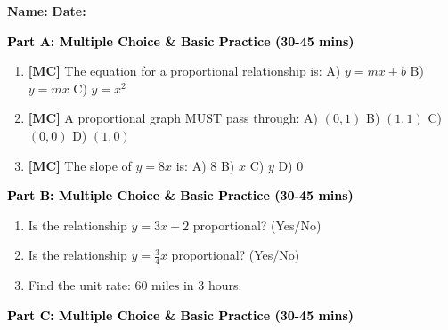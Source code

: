 \documentclass[12pt, letterpaper, fleqn]{article}
\newcommand{\blank}{\underline{\hspace{2.2cm}}}
\begin{document}
\textbf{Name:} \underline{\hspace{5cm}}
\hfill
\textbf{Date:} \underline{\hspace{3cm}}\\


\begin{tcolorbox}[colback=customteal!20]
\large\textcolor{black}{\textbf{Part A: Multiple Choice \& Basic Practice (30-45 mins)}}
\end{tcolorbox}

\vspace{3mm}

\begin{enumerate}[itemsep=2.5cm, leftmargin=0.6cm]
\item \textbf{[MC]} The equation for a proportional relationship is:
A) $y = mx + b$ \quad B) $y = mx$ \quad C) $y = x^2$
\item \textbf{[MC]} A proportional graph MUST pass through:
A) $(0, 1)$ \quad B) $(1, 1)$ \quad C) $(0, 0)$ \quad D) $(1, 0)$
\item \textbf{[MC]} The slope of $y = 8x$ is:
A) 8 \quad B) $x$ \quad C) $y$ \quad D) 0
\end{enumerate}

\newpage

\begin{tcolorbox}[colback=customteal!20]
\large\textcolor{black}{\textbf{Part B: Multiple Choice \& Basic Practice (30-45 mins)}}
\end{tcolorbox}

\vspace{3mm}

\begin{enumerate}[itemsep=2.5cm, leftmargin=0.6cm, resume]
\item Is the relationship $y = 3x + 2$ proportional? (Yes/No) \blank
\item Is the relationship $y = \frac{3}{4}x$ proportional? (Yes/No) \blank
\item Find the unit rate: $60\text{ miles}$ in 3 hours. \blank
\end{enumerate}

\newpage

\begin{tcolorbox}[colback=customteal!20]
\large\textcolor{black}{\textbf{Part C: Multiple Choice \& Basic Practice (30-45 mins)}}
\end{tcolorbox}

\vspace{3mm}
\end{document}
